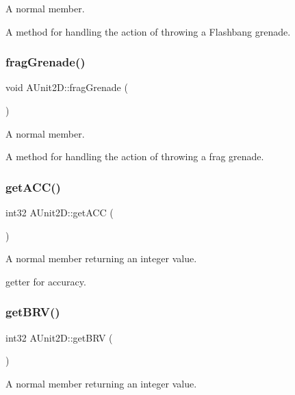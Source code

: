 A normal member. 

A method for handling the action of throwing a Flashbang grenade. \hypertarget{class_a_unit2_d_a6631cea7c02eb12361dc14439b942f70}{}\label{class_a_unit2_d_a6631cea7c02eb12361dc14439b942f70} 
\subsubsection{\texorpdfstring{frag\+Grenade()}{fragGrenade()}}
{\footnotesize\ttfamily void A\+Unit2\+D\+::frag\+Grenade (\begin{DoxyParamCaption}{ }\end{DoxyParamCaption})}



A normal member. 

A method for handling the action of throwing a frag grenade. \hypertarget{class_a_unit2_d_a0e21fbf4b83553f9910b4dd9a28ba2fb}{}\label{class_a_unit2_d_a0e21fbf4b83553f9910b4dd9a28ba2fb} 
\subsubsection{\texorpdfstring{get\+A\+C\+C()}{getACC()}}
{\footnotesize\ttfamily int32 A\+Unit2\+D\+::get\+A\+CC (\begin{DoxyParamCaption}{ }\end{DoxyParamCaption})}



A normal member returning an integer value. 

getter for accuracy. \hypertarget{class_a_unit2_d_a484b69b741bb37babd27306fbfc5990b}{}\label{class_a_unit2_d_a484b69b741bb37babd27306fbfc5990b} 
\subsubsection{\texorpdfstring{get\+B\+R\+V()}{getBRV()}}
{\footnotesize\ttfamily int32 A\+Unit2\+D\+::get\+B\+RV (\begin{DoxyParamCaption}{ }\end{DoxyParamCaption})}



A normal member returning an integer value. 

